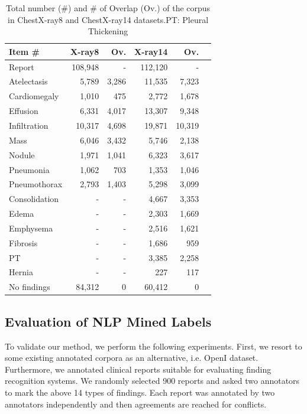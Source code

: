 \documentclass[10pt,twocolumn,letterpaper]{article}
\begin{document}
\begin{table}[h]
	\begin{center}
		\begin{tabular}{l|r|r|r|r|r}
			\hline
			Item \# &X-ray8 & Ov.& X-ray14 & Ov.\\
			\hline\hline
			Report &  108,948 & -& 112,120 &-\\
			\hline
			Atelectasis &  5,789 & 3,286 & 11,535 & 7,323 \\
			Cardiomegaly &  1,010 & 475& 2,772&1,678\\
			Effusion &  6,331 & 4,017& 13,307&9,348\\
			Infiltration &  10,317 & 4,698& 19,871&10,319\\
			Mass &  6,046 & 3,432& 5,746&2,138\\
			Nodule &  1,971 & 1,041 & 6,323&3,617\\
			Pneumonia &  1,062 & 703& 1,353&1,046\\
			Pneumothorax &  2,793 & 1,403& 5,298&3,099\\
			Consolidation &- &- & 4,667&3,353\\
			Edema &- &- & 2,303&1,669\\
			Emphysema &- &- & 2,516&1,621\\
			Fibrosis&- &- & 1,686&959\\
			PT&- &- & 3,385&2,258\\
			Hernia&- &- & 227&117\\
			No findings & 84,312 & 0& 60,412&0 \\
			\hline
		\end{tabular}
	\end{center}
	\caption{Total number (\#) and \# of Overlap (Ov.) of the corpus in ChestX-ray8 and ChestX-ray14 datasets.PT: Pleural Thickening}
	\label{tab:openi_corpus_14}
\end{table}



\subsection{ Evaluation of NLP Mined Labels}
To validate our method, we perform the following experiments. First, we resort to some existing annotated corpora as an alternative, i.e. OpenI dataset. Furthermore, we annotated clinical reports suitable for evaluating finding recognition systems. We randomly selected 900 reports and asked two annotators to mark the above 14 types of findings. Each report was annotated
by two annotators independently and then agreements are reached for conflicts.
\end{document}
